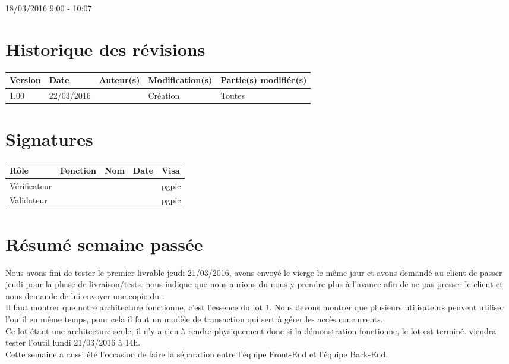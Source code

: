 \documentclass [a4paper] {article}
\begin{document}
18/03/2016			 				%
\hfill   
\hfill 	 9:00 - 10:07 				%


\section*{Historique des révisions}
\begin{center}
			\begin{tabular}{| p{2.5cm} | p{3cm} | p{3cm} | p{3cm} | p{3.5cm} |}
				\hline
				\rowcolor{Gray}
				Version & Date & Auteur(s) & Modification(s) & Partie(s) modifiée(s)		 \\
				\hline
				1.00 & 22/03/2016 & \Pierre & Création & Toutes \\
		\hline		
			\end{tabular}
		\end{center}

\section*{Signatures}

		\begin{center}
			\begin{tabular}{| p{2.5cm} | p{4cm} | p{3cm} | p{3cm} | p{2.5cm} |}
				\hline
				\rowcolor{Gray}
				Rôle & Fonction & Nom & Date & Visa		 \\
				\hline
				Vérificateur & \RQA & \Kafui &  & pgpic \\[30pt]
				\hline
				Validateur & \CP & \Sergi &  & pgpic \\[30pt]	
				\hline
			\end{tabular}
		\end{center}


\section{Résumé semaine passée}
Nous avons fini de tester le premier livrable jeudi 21/03/2016, avons envoyé le \CDR{} vierge le même jour et avons demandé au client de passer jeudi pour la phase de livraison/tests. \nomTuteurPedago{} nous indique que nous aurions du nous y prendre plus à l'avance afin de ne pas presser le client et nous demande de lui envoyer une copie du \CDR{}. \\
Il faut montrer que notre architecture fonctionne, c'est l'essence du lot 1. Nous devons montrer que plusieurs utilisateurs peuvent utiliser l'outil en même temps, pour cela il faut un modèle de transaction qui sert à gérer les accès concurrents. \\
Ce lot étant une architecture seule, il n'y a rien à rendre physiquement donc si la démonstration fonctionne, le lot est terminé. \nomTuteurPedago{} viendra tester l'outil lundi 21/03/2016 à 14h. \\
Cette semaine a aussi été l'occasion de faire la séparation entre l'équipe Front-End et l'équipe Back-End.
\end{document}
